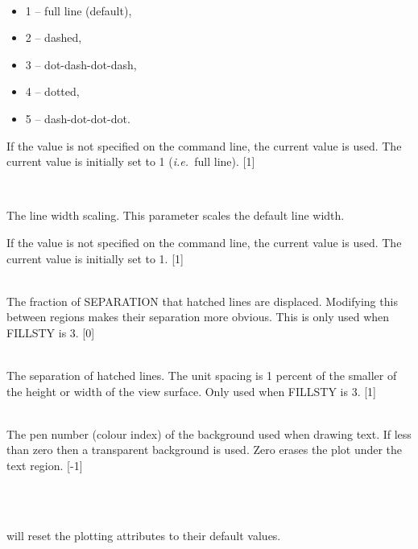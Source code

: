 \documentclass[twoside,11pt]{article}
\renewcommand{\_}{\texttt{\symbol{95}}}
\newcommand{\ie}{{\em i.e.\ }}
\newlength{\sstexampleslength}
\newcommand{\sstexamples}[1]{
   \item[Examples:] \mbox{} \\
   \vspace{-3.5ex}
   \begin{description}
      #1
   \end{description}
}
\newcommand{\sstsubsection}[1]{ \item[{#1}] \mbox{} \\}
\newcommand{\sstexamplesubsection}[2]{\sloppy
\item[\parbox{\sstexampleslength}{\ssttt #1}] \mbox{} \vspace{1.0ex}
\\ #2 }
\newcommand{\sstitemlist}[1]{
  \mbox{} \\
  \vspace{-3.5ex}
  \begin{itemize}
     #1
  \end{itemize}
}
\newcommand{\sstitem}{\item}
\newcommand{\sstexamples}[1]{
      \item[Examples:] \\
      \begin{description}
         #1
      \end{description}
      \\
   }
\newcommand{\sstsubsection}[1]{\item[{#1}]}
\newcommand{\sstexamplesubsection}[2]{\item[{\ssttt #1}] #2}
\newcommand{\sstitemlist}[1]{
      \begin{itemize}
         #1
      \end{itemize}
      \\
   }
\newcommand{\sstitem}{\item}
\begin{document}
{{{         \sstitemlist{

            \sstitem
               1 -- full line (default),

            \sstitem
               2 -- dashed,

            \sstitem
               3 -- dot-dash-dot-dash,

            \sstitem
               4 -- dotted,

            \sstitem
               5 -- dash-dot-dot-dot.

         }
         If the value is not specified on the command line, the current
         value is used. The current value is initially set to 1
         (\ie full line).
         [1]
      }
      \sstsubsection{
         LINEWID = \_INTEGER (Read)
      }{
         The line width scaling. This parameter scales the default line
         width.

         If the value is not specified on the command line, the current
         value is used. The current value is initially set to 1.
         [1]
      }
      \sstsubsection{
         PHASE = \_REAL (Read)
      }{
         The fraction of SEPARATION that hatched lines are displaced.
         Modifying this between regions makes their separation more
         obvious. This is only used when FILLSTY is 3.
         [0]
      }
      \sstsubsection{
         SEPARATION = \_REAL (Read)
      }{
         The separation of hatched lines. The unit spacing is 1 percent
         of the smaller of the height or width of the view surface.
         Only used when FILLSTY is 3.
         [1]
      }
      \sstsubsection{
         TEXTBACK = \_INTEGER (Read)
      }{
         The pen number (colour index) of the background used when
         drawing text. If less than zero then a transparent
         background is used. Zero erases the plot under the text
         region.
         [-1]
      }
   }
   \sstexamples{
      \sstexamplesubsection{
         ICL$>$ CHANGE RESET
      }{
         will reset the plotting attributes to their default values.
      }
   }
}
\end{document}
